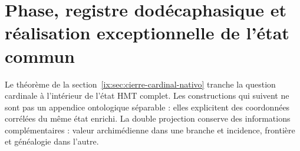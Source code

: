 \section{Phase, registre dodécaphasique et réalisation exceptionnelle de l'état commun}
\label{ix:sec:testigos-descendentes-ch}

Le théorème de la section~\ref{ix:sec:cierre-cardinal-nativo} tranche la question cardinale à l'intérieur de l'état HMT complet. Les constructions qui suivent ne sont pas un appendice ontologique séparable : elles explicitent des coordonnées corrélées du même état enrichi. La double projection conserve des informations complémentaires : valeur archimédienne dans une branche et incidence, frontière et généalogie dans l'autre.

